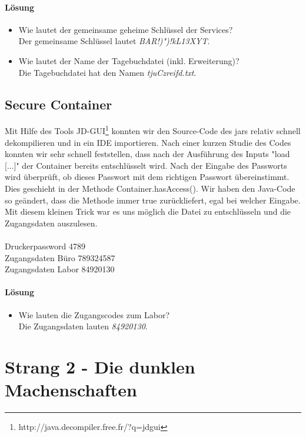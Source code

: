 \documentclass[12pt]{article}
\begin{document}
\paragraph{Lösung}
\begin{itemize}
	\item Wie lautet der gemeinsame geheime Schlüssel der Services? \\
		Der gemeinsame Schlüssel lautet \textit{BAR!)")!kL13XYT}.
	\item Wie lautet der Name der Tagebuchdatei (inkl. Erweiterung)?\\
		Die Tagebuchdatei hat den Namen \textit{tjuCzreifd.txt}.
\end{itemize}

\subsection{Secure Container}
Mit Hilfe des Tools JD-GUI\footnote{http://java.decompiler.free.fr/?q=jdgui} konnten wir den Source-Code des jars relativ schnell dekompilieren und in ein IDE importieren. Nach einer kurzen Studie des Codes konnten wir sehr schnell feststellen, dass nach der Ausführung des Inputs "load [...]" der Container bereits entschlüsselt wird. Nach der Eingabe des Passworts wird überprüft, ob dieses Passwort mit dem richtigen Passwort übereinstimmt. Dies geschieht in der Methode Container.hasAccess(). Wir haben den Java-Code so geändert, dass die Methode immer true zurückliefert, egal bei welcher Eingabe. Mit diesem kleinen Trick war es uns möglich die Datei zu entschlüsseln und die Zugangsdaten auszulesen. \\
 \\
Druckerpassword 4789\\
Zugangsdaten Büro 789324587\\
Zugangsdaten Labor 84920130

\paragraph{Lösung}
\begin{itemize}
	\item Wie lauten die Zugangscodes zum Labor?\\
		Die Zugangsdaten lauten \textit{84920130}.
\end{itemize}

\newpage
\section{Strang 2 - Die dunklen Machenschaften}
\end{document}

